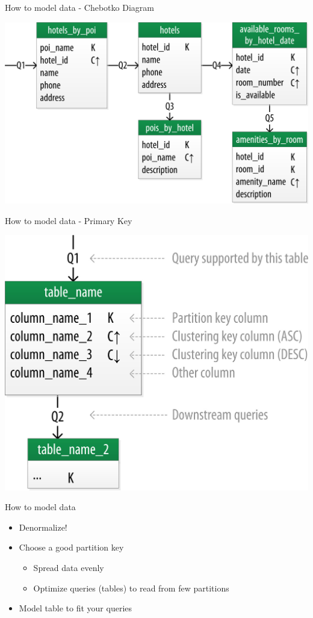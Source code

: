 \documentclass[
  10pt
]{beamer}
\begin{document}
\begin{frame}{How to model data - Chebotko Diagram \cite{cassandra_oreilly}}
  \begin{center}
    \includegraphics[width=0.75\columnwidth]{resources/model_example_chebotko_step3.png}
  \end{center}
\end{frame}

\begin{frame}{How to model data - Primary Key \cite{cassandra_oreilly}}
  \begin{center}
    \includegraphics[width=0.75\columnwidth]{resources/model_example_primary_key.jpeg}
  \end{center}
\end{frame}

\begin{frame}{How to model data}
  \begin{itemize}
    \item Denormalize!
    \item Choose a good partition key
      \begin{itemize}
        \item Spread data evenly
        \item Optimize queries (tables) to read from few partitions
      \end{itemize}
    \item Model table to fit your queries
  \end{itemize}
\end{frame}
\end{document}
